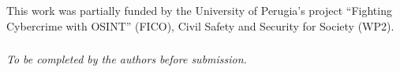 \documentclass[runningheads]{llncs}
\begin{document}
\begin{credits}
\subsubsection{\ackname}
This work was partially funded by the University of Perugia's project ``Fighting Cybercrime with OSINT'' (FICO), Civil Safety and Security for Society (WP2).

\subsubsection{\discintname}
\emph{To be completed by the authors before submission.}
\end{credits}



\end{document}
